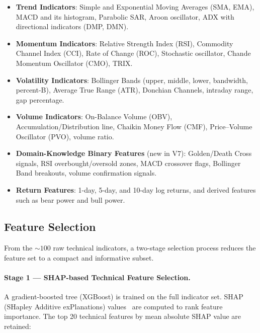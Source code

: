 \begin{itemize}
  \item \textbf{Trend Indicators}: Simple and Exponential Moving Averages (SMA, EMA),
        MACD and its histogram, Parabolic SAR, Aroon oscillator, ADX with
        directional indicators (DMP, DMN).

  \item \textbf{Momentum Indicators}: Relative Strength Index (RSI), Commodity
        Channel Index (CCI), Rate of Change (ROC), Stochastic oscillator, Chande
        Momentum Oscillator (CMO), TRIX.

  \item \textbf{Volatility Indicators}: Bollinger Bands (upper, middle, lower,
        bandwidth, percent-B), Average True Range (ATR), Donchian Channels,
        intraday range, gap percentage.

  \item \textbf{Volume Indicators}: On-Balance Volume (OBV), Accumulation/Distribution
        line, Chaikin Money Flow (CMF), Price--Volume Oscillator (PVO), volume
        ratio.

  \item \textbf{Domain-Knowledge Binary Features} (new in V7): Golden/Death Cross
        signals, RSI overbought/oversold zones, MACD crossover flags, Bollinger
        Band breakouts, volume confirmation signals.

  \item \textbf{Return Features}: 1-day, 5-day, and 10-day log returns, and
        derived features such as bear power and bull power.
\end{itemize}

\subsection{Feature Selection}
\label{sec:feature-selection}

From the ${\sim}100$ raw technical indicators, a two-stage selection process
reduces the feature set to a compact and informative subset.

\paragraph{Stage 1 --- SHAP-based Technical Feature Selection.}
A gradient-boosted tree (XGBoost) is trained on the full indicator set.
SHAP (SHapley Additive exPlanations) values~\cite{lundberg2017shap} are
computed to rank feature importance.  The top 20 technical features by mean
absolute SHAP value are retained:

